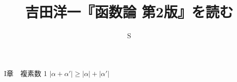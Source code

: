 \documentclass{article}
\title{吉田洋一『函数論 第2版』を読む}
\author{S}
\begin{document}
\maketitle
I章　複素数
1 $|\alpha+\alpha'|\ge|\alpha|+|\alpha'|$
\end{document}
